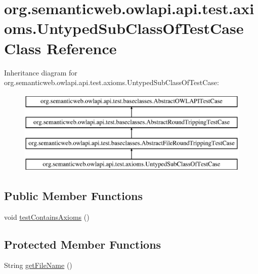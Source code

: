 \hypertarget{classorg_1_1semanticweb_1_1owlapi_1_1api_1_1test_1_1axioms_1_1_untyped_sub_class_of_test_case}{\section{org.\-semanticweb.\-owlapi.\-api.\-test.\-axioms.\-Untyped\-Sub\-Class\-Of\-Test\-Case Class Reference}
\label{classorg_1_1semanticweb_1_1owlapi_1_1api_1_1test_1_1axioms_1_1_untyped_sub_class_of_test_case}
}
Inheritance diagram for org.\-semanticweb.\-owlapi.\-api.\-test.\-axioms.\-Untyped\-Sub\-Class\-Of\-Test\-Case\-:\begin{figure}[H]
\begin{center}
\leavevmode
\includegraphics[height=4.000000cm]{classorg_1_1semanticweb_1_1owlapi_1_1api_1_1test_1_1axioms_1_1_untyped_sub_class_of_test_case}
\end{center}
\end{figure}
\subsection*{Public Member Functions}
\begin{DoxyCompactItemize}
\item 
void \hyperlink{classorg_1_1semanticweb_1_1owlapi_1_1api_1_1test_1_1axioms_1_1_untyped_sub_class_of_test_case_a1078050df202dd08b35cc3461904930a}{test\-Contains\-Axioms} ()
\end{DoxyCompactItemize}
\subsection*{Protected Member Functions}
\begin{DoxyCompactItemize}
\item 
String \hyperlink{classorg_1_1semanticweb_1_1owlapi_1_1api_1_1test_1_1axioms_1_1_untyped_sub_class_of_test_case_afe96d877a36e5d91bcbf496656883c86}{get\-File\-Name} ()
\end{DoxyCompactItemize}


